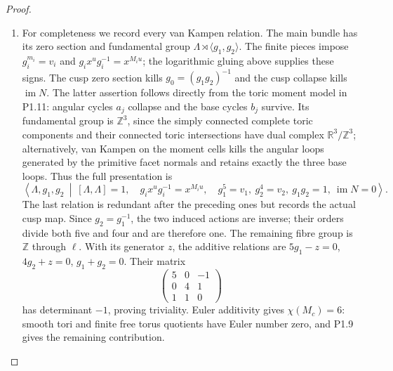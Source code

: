 \documentclass[11pt,a4paper]{article}
\theoremstyle{definition}
\begin{document}
\begin{proof}
\begin{enumerate}[label=\arabic*.]
\item For completeness we record every van Kampen relation.  The main
bundle has its zero section and fundamental group
$\Lambda\rtimes\langle g_1,g_2\rangle$.
The finite pieces impose
$g_i^{m_i}=v_i$ and $g_ix^ug_i^{-1}=x^{M_iu}$; the logarithmic gluing
above supplies these signs.  The cusp zero section kills
$g_0=(g_1g_2)^{-1}$ and the cusp collapse kills $\operatorname{im}N$.
The latter assertion follows directly from the toric moment model in
P1.11: angular cycles $a_j$ collapse and the base cycles $b_j$ survive.
Its fundamental group is $\mathbb Z^3$, since the simply connected
complete toric components and their connected toric intersections have
dual complex $\mathbb R^3/\mathbb Z^3$; alternatively, van Kampen on
the moment cells kills the angular loops generated by the primitive
facet normals and retains exactly the three base loops.
Thus the full presentation is
\[
\left\langle \Lambda,g_1,g_2\ \middle|\
 [\Lambda,\Lambda]=1,\quad
 g_ix^ug_i^{-1}=x^{M_iu},\quad
 g_1^5=v_1,\ g_2^4=v_2,\ g_1g_2=1,\ \operatorname{im}N=0
\right\rangle.
\]
The last relation is redundant after the preceding ones but records
the actual cusp map.  Since $g_2=g_1^{-1}$, the two induced actions are
inverse; their orders divide both five and four and are therefore one.
The remaining fibre group is $\mathbb Z$ through $\ell$.  With its
generator $z$, the additive relations are
$5g_1-z=0$, $4g_2+z=0$, $g_1+g_2=0$.
Their matrix
\[
\begin{pmatrix}5&0&-1\\0&4&1\\1&1&0\end{pmatrix}
\]
has determinant $-1$, proving triviality.
Euler additivity gives $\chi(M_c)=6$: smooth tori and finite free
torus quotients have Euler number zero, and P1.9 gives the remaining
contribution.

\end{enumerate}
\end{proof}
\end{document}

